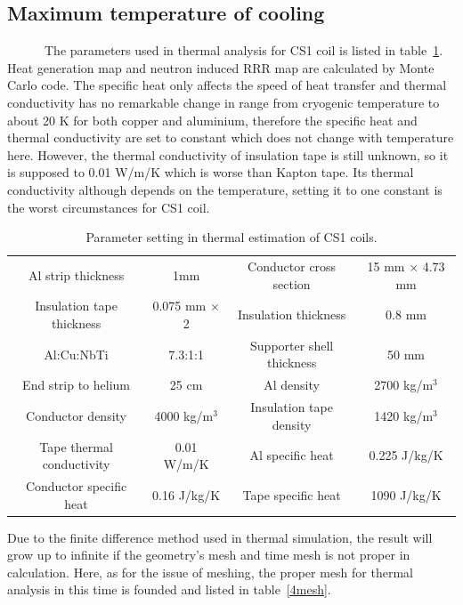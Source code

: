   \subsection{Maximum temperature of cooling}
~~~~~~The parameters used in thermal analysis for CS1 coil is listed in table~\ref{para}.
Heat generation map and neutron induced RRR map are calculated by Monte Carlo code.
The specific heat only affects the speed of heat transfer and thermal conductivity has no remarkable change in range from cryogenic temperature to about 20 K for both copper and aluminium, therefore the specific heat and thermal conductivity are set to constant which does not change with temperature here.
However, the thermal conductivity of insulation tape is still unknown, so it is supposed to 0.01 W/m/K which is worse than Kapton tape.
Its thermal conductivity although depends on the temperature, setting it to one constant is the worst circumstances for CS1 coil.
 \begin{table}[H]
  \centering
  \begin{tabular}{cccc} \hline \hline
   Al strip thickness & 1mm & Conductor cross section & 15 mm $\times$ 4.73 mm \\
   Insulation tape thickness & 0.075 mm $\times$ 2 & Insulation thickness & 0.8 mm \\
   Al:Cu:NbTi & 7.3:1:1 & Supporter shell thickness & 50 mm \\
   End strip to helium & 25 cm & Al density & 2700 kg/m$^3$ \\
   Conductor density & 4000 kg/m$^3$ & Insulation tape density & 1420 kg/m$^3$ \\
   Tape thermal conductivity & 0.01 W/m/K & Al specific heat & 0.225 J/kg/K \\
   Conductor specific heat & 0.16 J/kg/K & Tape specific heat & 1090 J/kg/K \\ \hline \hline
  \end{tabular}
 \caption{Parameter setting in thermal estimation of CS1 coils.}
 \label{para}
 \end{table}
Due to the finite difference method used in thermal simulation, the result will grow up to infinite if the geometry's mesh and time mesh is not proper in calculation.
Here, as for the issue of meshing, the proper mesh for thermal analysis in this time is founded and listed in table~\ref{4mesh}.

